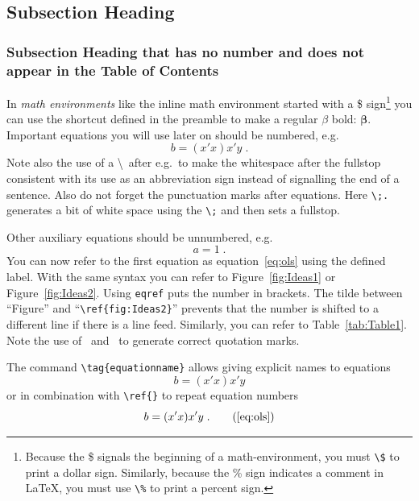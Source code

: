 \documentclass[a4paper,12pt]{scrartcl} %
\newcommand{\bs}{\boldsymbol}  %
\begin{document}
\subsection{Subsection Heading}

\subsubsection*{Subsection Heading that has no number and does not appear in the Table of Contents}


In \emph{math environments} like the inline math environment started with a \$ sign\footnote{Because the \$ signals the beginning of a math-environment, you must \texttt{\textbackslash\$} to print a dollar sign. Similarly, because the \% sign indicates a comment in \LaTeX, you must use \texttt{\textbackslash\%} to print a percent sign.} you can use the shortcut defined in the preamble to make a regular $\beta$ bold: $\bs \beta$. Important equations you will use later on should be numbered, e.g.\
\begin{equation}\label{eq:ols}
   b = (x'x)x'y \;.
\end{equation}
Note also the use of a \textbackslash\ after e.g.\ to make the whitespace after the fullstop consistent with its use as an abbreviation sign instead of signalling the end of a sentence. Also do not forget the punctuation marks after equations. Here \verb|\;.| generates a bit of white space using the \verb|\;| and then sets a fullstop.

Other auxiliary equations should be unnumbered, e.g.\
\begin{equation*}
   a = 1\;.
\end{equation*}
You can now refer to the first equation as equation~\eqref{eq:ols} using the defined label. With the same syntax you can refer to Figure~\ref{fig:Ideas1} or Figure~\ref{fig:Ideas2}. Using \texttt{eqref} puts the number in brackets. The tilde between ``Figure'' and  ``\verb|\ref{fig:Ideas2}|'' prevents that the number is shifted to a different line if there is a line feed. Similarly, you can refer to Table~\ref{tab:Table1}. Note the use of \textasciigrave\textasciigrave\ and \textquotesingle\textquotesingle\ to generate correct quotation marks.

The command \verb|\tag{equationname}| allows giving explicit names to equations
\begin{equation}
   b = (x'x)x'y  \tag{OLS Estimator}
\end{equation}
or in combination with \verb|\ref{}| to repeat equation numbers
\begin{equation}
   b = (x'x)x'y \;. \tag{\ref{eq:ols}}
\end{equation}
\end{document}
